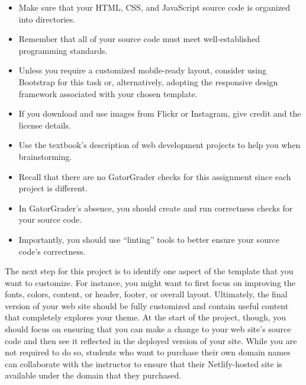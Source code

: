\documentclass[11pt]{article}
\begin{document}
\begin{itemize}
  \setlength{\itemsep}{.1in}

  \item Make sure that your HTML, CSS, and JavaScript source code is organized
    into directories.

  \item Remember that all of your source code must meet well-established
    programming standards.

  \item Unless you require a customized mobile-ready layout, consider using
    Bootstrap for this task or, alternatively, adopting the responsive design
    framework associated with your chosen template.

  \item If you download and use images from Flickr or Instagram, give
    credit and the license details.

  \item Use the textbook's description of web development projects to
    help you when brainstorming.

  \item Recall that there are no GatorGrader checks for this assignment since
    each project is different.

  \item In GatorGrader's absence, you should create and run correctness checks
    for your source code.

  \item Importantly, you should use ``linting'' tools to better ensure your
    source code's correctness.

\end{itemize}

The next step for this project is to identify one aspect of the template that
you want to customize. For instance, you might want to first focus on improving
the fonts, colors, content, or header, footer, or overall layout. Ultimately,
the final version of your web site should be fully customized and contain useful
content that completely explores your theme. At the start of the project,
though, you should focus on ensuring that you can make a change to your web
site's source code and then see it reflected in the deployed version of your
site.
%
While you are not required to do so, students who want to purchase their own
domain names can collaborate with the instructor to ensure that their
Netlify-hosted site is available under the domain that they purchased.
\end{document}
